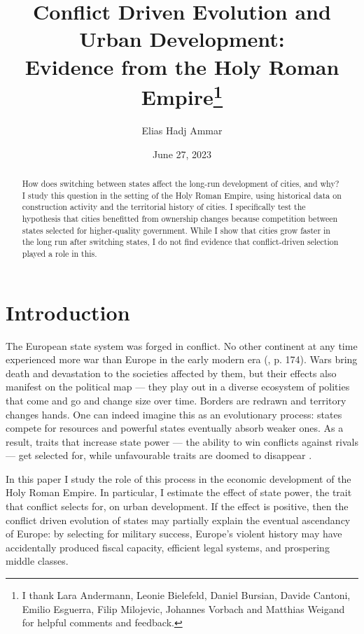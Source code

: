 \documentclass[11pt, a4paper]{article}
\title{Conflict Driven Evolution and Urban Development: \\ Evidence from the Holy Roman Empire\footnote{
I thank Lara Andermann, Leonie Bielefeld, Daniel Bursian, Davide Cantoni, Emilio Esguerra, Filip Milojevic, Johannes Vorbach and Matthias Weigand for helpful comments and feedback.
}
}
\author{Elias Hadj Ammar}
\date{June 27, 2023}
\begin{document}
\onehalfspacing
\maketitle
\thispagestyle{empty}

\begin{abstract}
How does switching between states affect the long-run development of cities, and why? I study this question in the setting of the Holy Roman Empire, using historical data on construction activity and the territorial history of cities. I specifically test the hypothesis that cities benefitted from ownership changes because competition between states selected for higher-quality government. While I show that cities grow faster in the long run after switching states, I do not find evidence that conflict-driven selection played a role in this.
\end{abstract}

\newpage

\setcounter{page}{1}
\doublespacing



\section{Introduction}



The European state system was forged in conflict. No other continent at any time experienced more war than Europe in the early modern era (\citealp{voigtlnder2013}, p. 174). Wars bring death and devastation to the societies affected by them, but their effects also manifest on the political map --- they play out in a diverse ecosystem of polities that come and go and change size over time. Borders are redrawn and territory changes hands. One can indeed imagine this as an evolutionary process: states compete for resources and powerful states eventually absorb weaker ones. As a result, traits that increase state power --- the ability to win conflicts against rivals --- get selected for, while unfavourable traits are doomed to disappear \citep{levine2021}.

In this paper I study the role of this process in the economic development of the Holy Roman Empire. In particular, I estimate the effect of state power, the trait that conflict selects for, on urban development. If the effect is positive, then the conflict driven evolution of states may partially explain the eventual ascendancy of Europe: by selecting for military success, Europe's violent history may have accidentally produced fiscal capacity, efficient legal systems, and prospering middle classes.
\end{document}

